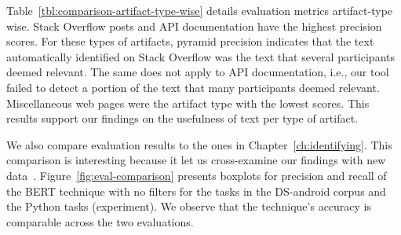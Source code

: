 



Table~\ref{tbl:comparison-artifact-type-wise} details evaluation metrics artifact-type wise. 
Stack Overflow posts and API documentation have the highest precision scores. For these types of artifacts, pyramid precision indicates that the 
text automatically identified on Stack Overflow was the text that several participants deemed relevant. 
The same does not apply to API documentation, i.e., our tool failed to detect a portion of the text that many participants deemed relevant. 
Miscellaneous web pages were the artifact type with the lowest scores. This results support our findings 
on the usefulness of text per type of artifact.





We also compare evaluation results to the ones in Chapter~\ref{ch:identifying}. 
This comparison is interesting because it let us cross-examine our findings with new data~\cite{easterbrook2008, Seaman1999}.
Figure~\ref{fig:eval-comparison} presents boxplots for precision and recall of the BERT technique with no filters 
for the tasks in the \acs{DS-android} corpus and the Python tasks (experiment). We observe that the technique's accuracy
is comparable across the two evaluations. 




